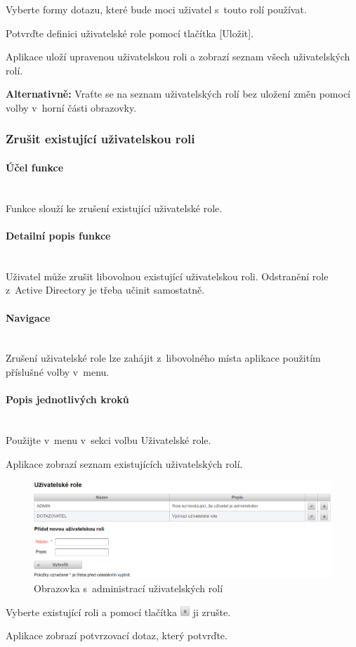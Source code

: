 \documentclass[thesis=M,czech]{FITthesis}[2019/12/23]
\newcommand{\lbparagraph}[1]{\paragraph{#1}\mbox{}\\} %
\newenvironment{reusefigure}[2][htbp]
  {\addtocounter{figure}{-1}%
   \renewcommand{\theHfigure}{dupe-fig}%
   \renewcommand{\thefigure}{\ref{#2}}%
   \renewcommand{\addcontentsline}[3]{}%
   \begin{figure}[#1]}
  {\end{figure}} %
\begin{document}
Vyberte formy dotazu, které bude moci uživatel s~touto rolí používat.

Potvrďte definici uživatelské role pomocí tlačítka [Uložit].

Aplikace uloží upravenou uživatelskou roli a zobrazí seznam všech uživatelských rolí.

\textbf{Alternativně:} Vraťte se na seznam uživatelských rolí bez uložení změn pomocí volby  v~horní části obrazovky.

\newpage
\subsubsection{Zrušit existující uživatelskou roli}
\lbparagraph{Účel funkce}
Funkce slouží ke zrušení existující uživatelské role.

\lbparagraph{Detailní popis funkce}
Uživatel může zrušit libovolnou existující uživatelskou roli. Odstranění role z~Active Directory je třeba učinit samostatně.

\lbparagraph{Navigace}
Zrušení uživatelské role lze zahájit z~libovolného místa aplikace použitím příslušné volby v~menu.

\lbparagraph{Popis jednotlivých kroků}
Použijte v~menu v~sekci  volbu Uživatelské role.

Aplikace zobrazí seznam existujících uživatelských rolí.

\begin{reusefigure}[H]{fig:Obrazovka s~administrací uživatelských rolí}
  \includegraphics[width=\textwidth]{res/guide/UserRoles.png}
  \caption{Obrazovka s~administrací uživatelských rolí}
\end{reusefigure}

Vyberte existující roli a pomocí tlačítka \includegraphics[height=1em]{res/guide/RemoveIcon.png} ji zrušte.

Aplikace zobrazí potvrzovací dotaz, který potvrďte. 
\end{document}

